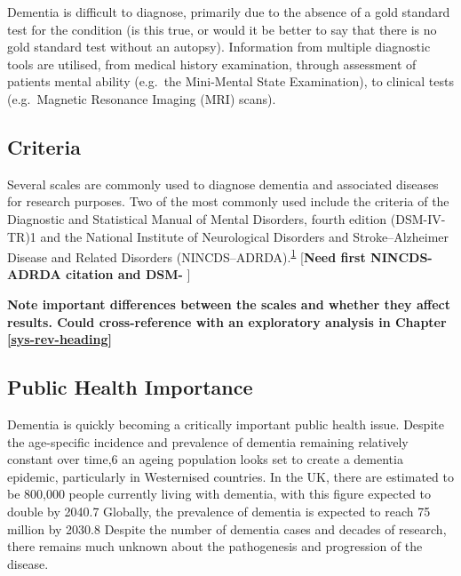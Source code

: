 \documentclass[a4paper, twoside]{templates/ociamthesis}
\newenvironment{Shaded}{\begin{snugshade}}{\end{snugshade}}
\newcommand{\DataTypeTok}[1]{\textcolor[rgb]{0.13,0.29,0.53}{#1}}
\newcommand{\KeywordTok}[1]{\textcolor[rgb]{0.13,0.29,0.53}{\textbf{#1}}}
\newcommand{\NormalTok}[1]{#1}
\newcommand{\OperatorTok}[1]{\textcolor[rgb]{0.81,0.36,0.00}{\textbf{#1}}}
\newcommand{\StringTok}[1]{\textcolor[rgb]{0.31,0.60,0.02}{#1}}
\renewenvironment{Shaded}
{
  \vspace{4pt}%
  \begin{snugshade}%
}{%
  \end{snugshade}%
  \vspace{4pt}%
}
\begin{document}
Dementia is difficult to diagnose, primarily due to the absence of a gold standard test for the condition (is this true, or would it be better to say that there is no gold standard test without an autopsy). Information from multiple diagnostic tools are utilised, from medical history examination, through assessment of patients mental ability (e.g.~the Mini-Mental State Examination), to clinical tests (e.g.~Magnetic Resonance Imaging (MRI) scans).

\hypertarget{criteria}{%
\subsection{Criteria}\label{criteria}}

Several scales are commonly used to diagnose dementia and associated diseases for research purposes. Two of the most commonly used include the criteria of the Diagnostic and Statistical Manual of Mental Disorders, fourth edition (DSM-IV-TR)1 and the National Institute of Neurological Disorders and Stroke--Alzheimer Disease and Related Disorders (NINCDS--ADRDA).\textsuperscript{\protect\hyperlink{ref-dubois2007}{1}} {[}\textbf{Need first NINCDS-ADRDA citation and DSM- }{]}

\textbf{Note important differences between the scales and whether they affect results. Could cross-reference with an exploratory analysis in Chapter \ref{sys-rev-heading}}

\hypertarget{public-health-importance}{%
\subsection{Public Health Importance}\label{public-health-importance}}

Dementia is quickly becoming a critically important public health issue. Despite the age-specific incidence and prevalence of dementia remaining relatively constant over time,6 an ageing population looks set to create a dementia epidemic, particularly in Westernised countries. In the UK, there are estimated to be 800,000 people currently living with dementia, with this figure expected to double by 2040.7 Globally, the prevalence of dementia is expected to reach 75 million by 2030.8 Despite the number of dementia cases and decades of research, there remains much unknown about the pathogenesis and progression of the disease.

\begin{Shaded}
\end{Shaded}
\end{document}
